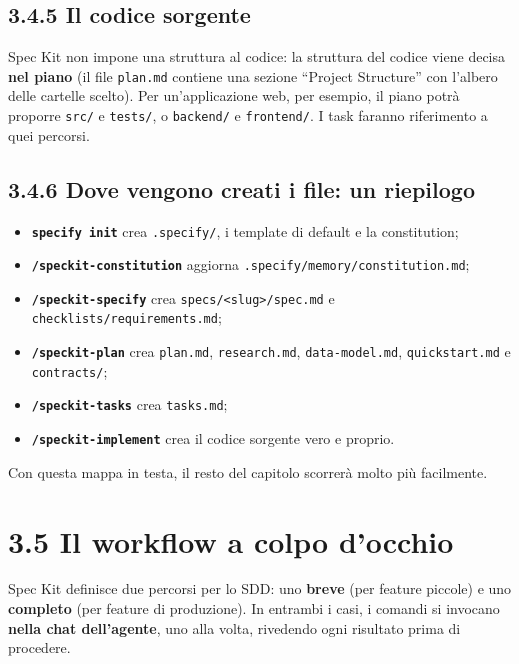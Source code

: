 \documentclass[
  italian,
  10pt,
]{book}
\providecommand{\tightlist}{%
  \setlength{\itemsep}{0pt}\setlength{\parskip}{0pt}}
\begin{document}
\subsection{3.4.5 Il codice sorgente}\label{il-codice-sorgente}

Spec Kit non impone una struttura al codice: la struttura del codice
viene decisa \textbf{nel piano} (il file \texttt{plan.md} contiene una
sezione ``Project Structure'' con l'albero delle cartelle scelto). Per
un'applicazione web, per esempio, il piano potrà proporre \texttt{src/}
e \texttt{tests/}, o \texttt{backend/} e \texttt{frontend/}. I task
faranno riferimento a quei percorsi.

\subsection{3.4.6 Dove vengono creati i file: un
riepilogo}\label{dove-vengono-creati-i-file-un-riepilogo}

\begin{itemize}
\tightlist
\item
  \textbf{\texttt{specify\ init}} crea \texttt{.specify/}, i template di
  default e la constitution;
\item
  \textbf{\texttt{/speckit-constitution}} aggiorna
  \texttt{.specify/memory/constitution.md};
\item
  \textbf{\texttt{/speckit-specify}} crea
  \texttt{specs/\textless{}slug\textgreater{}/spec.md} e
  \texttt{checklists/requirements.md};
\item
  \textbf{\texttt{/speckit-plan}} crea \texttt{plan.md},
  \texttt{research.md}, \texttt{data-model.md}, \texttt{quickstart.md} e
  \texttt{contracts/};
\item
  \textbf{\texttt{/speckit-tasks}} crea \texttt{tasks.md};
\item
  \textbf{\texttt{/speckit-implement}} crea il codice sorgente vero e
  proprio.
\end{itemize}

Con questa mappa in testa, il resto del capitolo scorrerà molto più
facilmente.

\section{3.5 Il workflow a colpo
d'occhio}\label{il-workflow-a-colpo-docchio}

Spec Kit definisce due percorsi per lo SDD: uno \textbf{breve} (per
feature piccole) e uno \textbf{completo} (per feature di produzione). In
entrambi i casi, i comandi si invocano \textbf{nella chat dell'agente},
uno alla volta, rivedendo ogni risultato prima di procedere.
\end{document}
